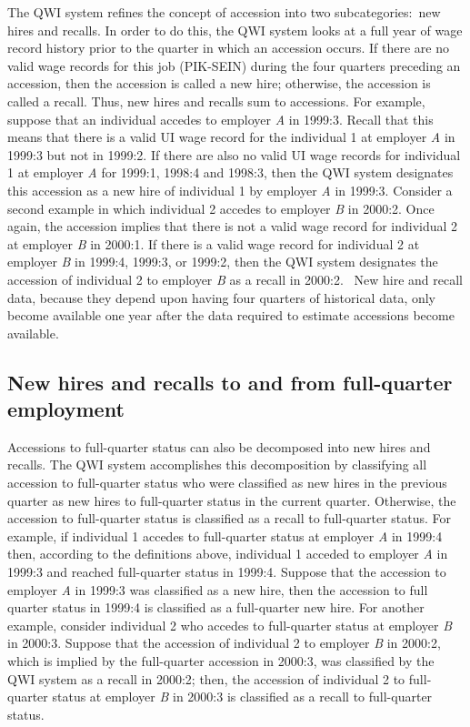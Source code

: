 The QWI system refines the concept of accession into two subcategories:\ new
hires and recalls. In order to do this, the QWI system looks at a full year
of wage record history prior to the quarter in which an accession occurs. If
there are no valid wage records for this job (PIK-SEIN)
during the four quarters preceding an accession, then the accession is
called a new hire; otherwise, the accession is called a recall. Thus, new
hires and recalls sum to accessions. For example, suppose that an individual
accedes to employer \textit{A} in 1999:3. Recall that this means that there
is a valid UI wage record for the individual 1 at employer \textit{A%
} in 1999:3 but not in 1999:2. If there are also no valid {UI} wage
records for individual 1 at employer \textit{A} for 1999:1, 1998:4 and
1998:3, then the QWI system designates this accession as a new hire of
individual 1 by employer \textit{A} in 1999:3. Consider a second example in
which individual 2 accedes to employer \textit{B} in 2000:2. Once again, the
accession implies that there is not a valid wage record for individual 2 at
employer \textit{B} in 2000:1. If there is a valid wage record for
individual 2 at employer \textit{B} in 1999:4, 1999:3, or 1999:2, then the
QWI system designates the accession of individual 2 to employer \textit{B}
as a recall in 2000:2. \ New hire and recall data, because they depend upon
having four quarters of historical data, only become available one year
after the data required to estimate accessions become available.

\subsection{New hires and recalls to and from full-quarter employment}

 

Accessions to full-quarter status can also be decomposed into new hires and
recalls. The QWI system accomplishes this decomposition by classifying all
accession to full-quarter status who were classified as new hires in the
previous quarter as new hires to full-quarter status in the current quarter.
Otherwise, the accession to full-quarter status is classified as a recall to
full-quarter status. For example, if individual 1 accedes to full-quarter
status at employer \textit{A} in 1999:4 then, according to the definitions
above, individual 1 acceded to employer \textit{A} in 1999:3 and reached
full-quarter status in 1999:4. Suppose that the accession to employer 
\textit{A} in 1999:3 was classified as a new hire, then the accession to
full quarter status in 1999:4 is classified as a full-quarter new hire. For
another example, consider individual 2 who accedes to full-quarter status at
employer \textit{B} in 2000:3. Suppose that the accession of individual 2 to
employer \textit{B} in 2000:2, which is implied by the full-quarter
accession in 2000:3, was classified by the QWI system as a recall in 2000:2;
then, the accession of individual 2 to full-quarter status at employer 
\textit{B} in 2000:3 is classified as a recall to full-quarter status.

